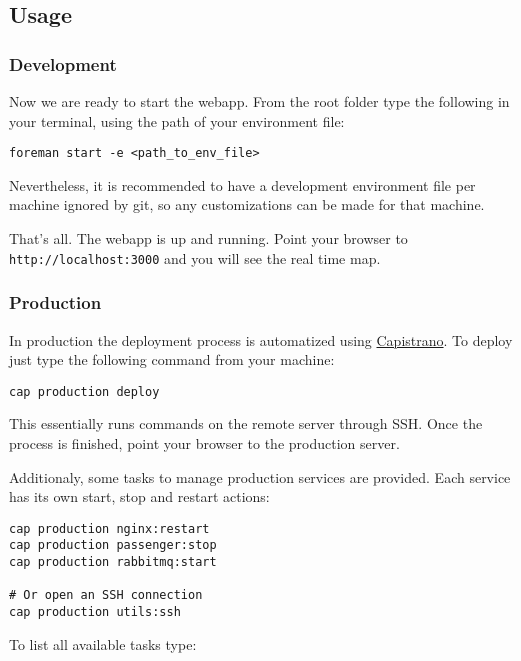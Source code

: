 \subsection*{Usage}\label{usage}

\subsubsection*{Development}\label{development}

Now we are ready to start the webapp. From the root folder type the
following in your terminal, using the path of your environment file:

\begin{verbatim}
foreman start -e <path_to_env_file>
\end{verbatim}

Nevertheless, it is recommended to have a development environment file
per machine ignored by git, so any customizations can be made for that
machine.

That's all. The webapp is up and running. Point your browser to
\texttt{http://localhost:3000} and you will see the real time map.

\subsubsection*{Production}\label{production}

In production the deployment process is automatized using
\href{http://capistranorb.com/}{Capistrano}. To deploy just type the
following command from your machine:

\begin{verbatim}
cap production deploy
\end{verbatim}

This essentially runs commands on the remote server through SSH. Once
the process is finished, point your browser to the production server.

Additionaly, some tasks to manage production services are provided. Each
service has its own start, stop and restart actions:

\begin{verbatim}
cap production nginx:restart
cap production passenger:stop
cap production rabbitmq:start

# Or open an SSH connection
cap production utils:ssh
\end{verbatim}

To list all available tasks type:

